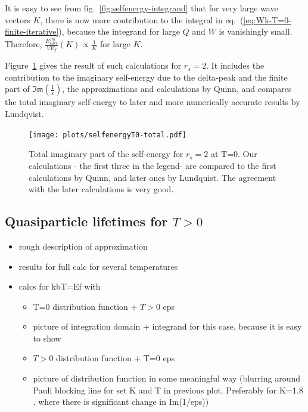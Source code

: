\documentclass[physics,phd,nolot,nolof]{uccthesis}%
\begin{document}
{It is easy to see from fig.~\ref{fig:selfenergy-integrand} that for very large
wave vectors $K$, there is now more contribution to the integral in eq.~(\ref{eq:Wk-T=0-finite-iterative}), because the integrand for large $Q$ and $W$ is vanishingly
small. 
Therefore, $\frac{ E_{corr}^{Im}}{V E_f}(K) \propto \frac{1}{K}$  for large $K$.

Figure~\ref{fig:selfenergyT0-total} gives the result of such calculations
for $r_s=2$. It includes the contribution to the imaginary self-energy
due to the delta-peak and the finite part of $\mathfrak{Im}(\frac{1}{\varepsilon})$,
the approximations and calculations by Quinn\cite{Quinn1962}, and 
compares the total imaginary self-energy to later and more numerically accurate
results by Lundqvist\cite{Lundqvist}.
\begin{figure}[htp]
  \begin{center}
    \texttt{[image: plots/selfenergyT0-total.pdf]}
  \end{center}
  \caption{Total imaginary part of the self-energy for $r_s=2$ at T=0.
  Our calculations - the first three in the legend- are compared to the first calculations by Quinn\cite{Quinn1962},
  and later ones by Lundquist\cite{Lundqvist}.
  The agreement with the later calculations is very good.
  }
  \label{fig:selfenergyT0-total}
\end{figure}
\subsection{Quasiparticle lifetimes for $T>0$ }
\begin{itemize}
  \item rough description of approximation
  \item results for full calc for several temperatures
  \item calcs for kbT=Ef with
    \begin{itemize}
      \item T=0 distribution function + $T>0$ eps
  	\item picture of integration domain + integrand  for this case, because
	  it is easy to show
      \item $T>0$ distribution function + T=0 eps
      \item picture of distribution function in some meaningful way
	(blurring around Pauli blocking line for set K and T in previous plot. Preferably for K=1.8 , where there is significant change in Im(1/eps))
    \end{itemize}
\end{itemize}
}
\end{document}
